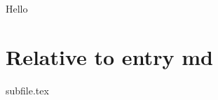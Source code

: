 \documentclass{article}
\begin{document}
Hello

\section{Relative to entry md}

{subfile.tex}
\end{document}
